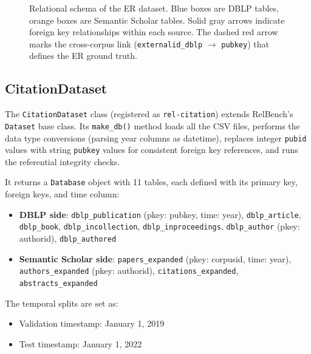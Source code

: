 \documentclass{article}
\begin{document}
\begin{figure}[h!]
{
}%
\caption{Relational schema of the ER dataset. Blue boxes are DBLP tables, orange boxes are Semantic Scholar tables. Solid gray arrows indicate foreign key relationships within each source. The dashed red arrow marks the cross-corpus link (\texttt{externalid\_dblp} $\to$ \texttt{pubkey}) that defines the ER ground truth.}
\label{fig:schema}
\end{figure}

\subsection{CitationDataset}

The \texttt{CitationDataset} class (registered as \texttt{rel-citation}) extends RelBench's \texttt{Dataset} base class.
Its \texttt{make\_db()} method loads all the CSV files, performs the data type conversions (parsing year columns as datetime), replaces integer \texttt{pubid} values with string \texttt{pubkey} values for consistent foreign key references, and runs the referential integrity checks.

It returns a \texttt{Database} object with 11 tables, each defined with its primary key, foreign keys, and time column:

\begin{itemize}
    \item \textbf{DBLP side}: \texttt{dblp\_publication} (pkey: pubkey, time: year), \texttt{dblp\_article}, \texttt{dblp\_book}, \texttt{dblp\_incollection}, \texttt{dblp\_inproceedings}, \texttt{dblp\_author} (pkey: authorid), \texttt{dblp\_authored}
    \item \textbf{Semantic Scholar side}: \texttt{papers\_expanded} (pkey: corpusid, time: year), \texttt{authors\_expanded} (pkey: authorid), \texttt{citations\_expanded}, \texttt{abstracts\_expanded}
\end{itemize}

The temporal splits are set as:
\begin{itemize}
    \item Validation timestamp: January 1, 2019
    \item Test timestamp: January 1, 2022
\end{itemize}
\end{document}
